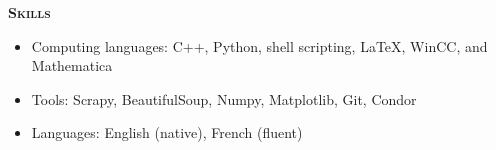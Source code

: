 \documentclass[line]{letter}
\begin{document}
{\vspace{12pt}\Large  \textsc{\textbf{Skills}} }
\vspace{-1mm}
\begin{itemize}[leftmargin=5mm]%


\item Computing languages: C++, Python, shell scripting, \LaTeX, WinCC, and Mathematica
\item Tools: Scrapy, BeautifulSoup, Numpy, Matplotlib, Git, Condor
\item Languages: English (native), French (fluent)
\end{itemize}

\end{document}
